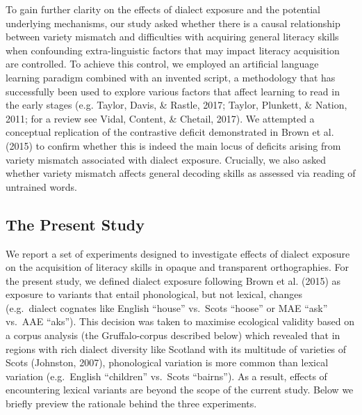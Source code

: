 \documentclass[doc,floatsintext]{apa6}
\begin{document}
To gain further clarity on the effects of dialect exposure and the
potential underlying mechanisms, our study asked whether there is a
causal relationship between variety mismatch and difficulties with
acquiring general literacy skills when confounding extra-linguistic
factors that may impact literacy acquisition are controlled. To achieve
this control, we employed an artificial language learning paradigm
combined with an invented script, a methodology that has successfully
been used to explore various factors that affect learning to read in the
early stages (e.g. Taylor, Davis, \& Rastle, 2017; Taylor, Plunkett, \&
Nation, 2011; for a review see Vidal, Content, \& Chetail, 2017). We
attempted a conceptual replication of the contrastive deficit
demonstrated in Brown et al. (2015) to confirm whether this is indeed
the main locus of deficits arising from variety mismatch associated with
dialect exposure. Crucially, we also asked whether variety mismatch
affects general decoding skills as assessed via reading of untrained
words.

\subsection{The Present Study}\label{the-present-study}

We report a set of experiments designed to investigate effects of
dialect exposure on the acquisition of literacy skills in opaque and
transparent orthographies. For the present study, we defined dialect
exposure following Brown et al. (2015) as exposure to variants that
entail phonological, but not lexical, changes (e.g.~dialect cognates
like English \enquote{house} vs.~Scots \enquote{hoose} or MAE
\enquote{ask} vs.~AAE \enquote{aks}). This decision was taken to
maximise ecological validity based on a corpus analysis (the
Gruffalo-corpus described below) which revealed that in regions with
rich dialect diversity like Scotland with its multitude of varieties of
Scots (Johnston, 2007), phonological variation is more common than
lexical variation (e.g.~English \enquote{children} vs.~Scots
\enquote{bairns}). As a result, effects of encountering lexical variants
are beyond the scope of the current study. Below we briefly preview the
rationale behind the three experiments.
\end{document}
